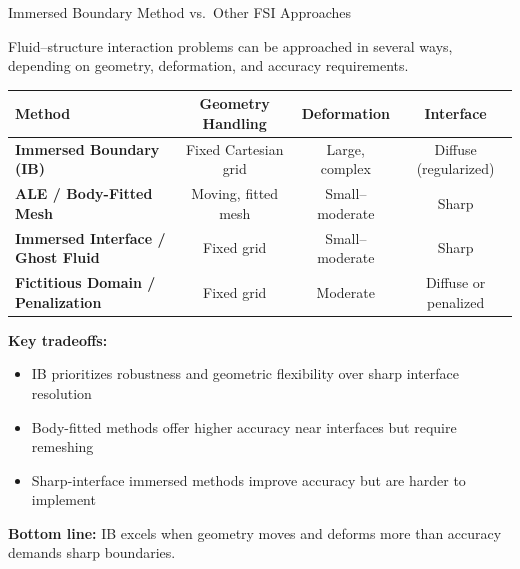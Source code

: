 \documentclass{beamer}
\begin{document}
\begin{frame}{Immersed Boundary Method vs.\ Other FSI Approaches}

\small
Fluid--structure interaction problems can be approached in several ways,
depending on geometry, deformation, and accuracy requirements.

\tiny
\medskip
\begin{center}
\begin{tabular}{l|c|c|c}
\textbf{Method} & \textbf{Geometry Handling} & \textbf{Deformation} & \textbf{Interface} \\
\hline
\textbf{Immersed Boundary (IB)} 
& Fixed Cartesian grid 
& Large, complex 
& Diffuse (regularized) \\
\textbf{ALE / Body-Fitted Mesh} 
& Moving, fitted mesh 
& Small--moderate 
& Sharp \\
\textbf{Immersed Interface / Ghost Fluid} 
& Fixed grid 
& Small--moderate 
& Sharp \\
\textbf{Fictitious Domain / Penalization} 
& Fixed grid 
& Moderate 
& Diffuse or penalized \\
\end{tabular}
\end{center}

\small
\medskip
\textbf{Key tradeoffs:}
\begin{itemize}
    \item IB prioritizes robustness and geometric flexibility over sharp interface resolution
    \item Body-fitted methods offer higher accuracy near interfaces but require remeshing
    \item Sharp-interface immersed methods improve accuracy but are harder to implement
\end{itemize}

\medskip
\textbf{Bottom line:} IB excels when geometry moves and deforms more than accuracy demands sharp boundaries.
\end{frame}
\end{document}

